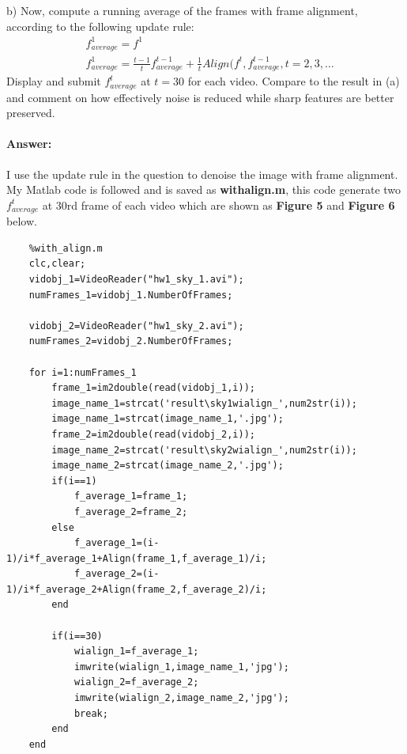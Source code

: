 \documentclass[
	12pt, %
]{fphw}
\begin{document}
\begin{problem}
	b)  Now, compute a running average of the frames with frame alignment, according to the following update rule:
	\begin{align*}
		&f^1_{average}=f^1 \\
		&f^1_{average}=\frac{t-1}{t}f^{t-1}_{average}+\frac{1}{t}Align(f^t, f^{t-1}_{average}, t=2,3,\dots
	\end{align*}
	Display and submit $f^t_{average}$ at $t=30$ for each video. Compare to the result in (a) and comment on how effectively noise is reduced while sharp features are better preserved.
\end{problem}



\paragraph*{Answer:}I use the update rule in the question to denoise the image with frame alignment. My Matlab code is followed and is saved as \textbf{with\underline{\hspace{0.5em}}align.m}, this code generate two $f^t_{average}$ at 30rd frame of each video which are shown as \textbf{Figure 5} and \textbf{Figure 6} below.
\begin{lstlisting}
	%with_align.m
	clc,clear;
	vidobj_1=VideoReader("hw1_sky_1.avi");
	numFrames_1=vidobj_1.NumberOfFrames;
	
	vidobj_2=VideoReader("hw1_sky_2.avi");
	numFrames_2=vidobj_2.NumberOfFrames;
	
	for i=1:numFrames_1
		frame_1=im2double(read(vidobj_1,i));
		image_name_1=strcat('result\sky1wialign_',num2str(i));
		image_name_1=strcat(image_name_1,'.jpg');
		frame_2=im2double(read(vidobj_2,i));
		image_name_2=strcat('result\sky2wialign_',num2str(i));
		image_name_2=strcat(image_name_2,'.jpg');
		if(i==1)
			f_average_1=frame_1;
			f_average_2=frame_2;
		else
			f_average_1=(i-1)/i*f_average_1+Align(frame_1,f_average_1)/i;
			f_average_2=(i-1)/i*f_average_2+Align(frame_2,f_average_2)/i;
		end
		
		if(i==30)
			wialign_1=f_average_1;
			imwrite(wialign_1,image_name_1,'jpg');
			wialign_2=f_average_2;
			imwrite(wialign_2,image_name_2,'jpg');
			break;
		end
	end
\end{lstlisting}
\end{document}
